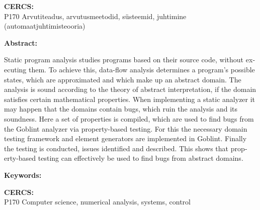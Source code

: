 \documentclass[../thesis.tex]{subfiles}
\begin{document}
\noindent\textbf{CERCS:}\\
P170 Arvutiteadus, arvutusmeetodid, süsteemid, juhtimine (automaatjuhtimisteooria)

\vspace*{5ex}

\begin{otherlanguage}{english}

\noindent\textbf{\large \mytitle}

\vspace*{1ex}

\noindent\textbf{Abstract:}

\noindent
Static program analysis studies programs based on their source code, without executing them.
To achieve this, data-flow analysis determines a program's possible states, which are approximated and which make up an abstract domain. The analysis is sound according to the theory of abstract interpretation, if the domain satisfies certain mathematical properties.
When implementing a static analyzer it may happen that the domains contain bugs, which ruin the analysis and its soundness.
Here a set of properties is compiled, which are used to find bugs from the Goblint analyzer via property-based testing.
For this the necessary domain testing framework and element generators are implemented in Goblint. Finally the testing is conducted, issues identified and described.
This shows that property-based testing can effectively be used to find bugs from abstract domains.

\vspace*{1ex}

\noindent\textbf{Keywords:}\\
\mykeywords

\vspace*{1ex}

\noindent\textbf{CERCS:}\\
P170 Computer science, numerical analysis, systems, control

\vspace*{1ex}

\end{otherlanguage} %
\end{document}
